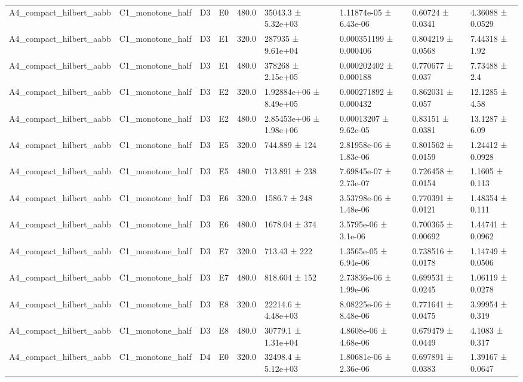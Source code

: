 \begin{table}
\begin{tabular}{lllllllll}
A4\_compact\_hilbert\_aabb & C1\_monotone\_half & D3 & E0 & 480.0 & 35043.3 ± 5.32e+03 & 1.11874e-05 ± 6.43e-06 & 0.60724 ± 0.0341 & 4.36088 ± 0.0529 \\
A4\_compact\_hilbert\_aabb & C1\_monotone\_half & D3 & E1 & 320.0 & 287935 ± 9.61e+04 & 0.000351199 ± 0.000406 & 0.804219 ± 0.0568 & 7.44318 ± 1.92 \\
A4\_compact\_hilbert\_aabb & C1\_monotone\_half & D3 & E1 & 480.0 & 378268 ± 2.15e+05 & 0.000202402 ± 0.000188 & 0.770677 ± 0.037 & 7.73488 ± 2.4 \\
A4\_compact\_hilbert\_aabb & C1\_monotone\_half & D3 & E2 & 320.0 & 1.92884e+06 ± 8.49e+05 & 0.000271892 ± 0.000432 & 0.862031 ± 0.057 & 12.1285 ± 4.58 \\
A4\_compact\_hilbert\_aabb & C1\_monotone\_half & D3 & E2 & 480.0 & 2.85453e+06 ± 1.98e+06 & 0.00013207 ± 9.62e-05 & 0.83151 ± 0.0381 & 13.1287 ± 6.09 \\
A4\_compact\_hilbert\_aabb & C1\_monotone\_half & D3 & E5 & 320.0 & 744.889 ± 124 & 2.81958e-06 ± 1.83e-06 & 0.801562 ± 0.0159 & 1.24412 ± 0.0928 \\
A4\_compact\_hilbert\_aabb & C1\_monotone\_half & D3 & E5 & 480.0 & 713.891 ± 238 & 7.69845e-07 ± 2.73e-07 & 0.726458 ± 0.0154 & 1.1605 ± 0.113 \\
A4\_compact\_hilbert\_aabb & C1\_monotone\_half & D3 & E6 & 320.0 & 1586.7 ± 248 & 3.53798e-06 ± 1.48e-06 & 0.770391 ± 0.0121 & 1.48354 ± 0.111 \\
A4\_compact\_hilbert\_aabb & C1\_monotone\_half & D3 & E6 & 480.0 & 1678.04 ± 374 & 3.5795e-06 ± 3.1e-06 & 0.700365 ± 0.00692 & 1.44741 ± 0.0962 \\
A4\_compact\_hilbert\_aabb & C1\_monotone\_half & D3 & E7 & 320.0 & 713.43 ± 222 & 1.3565e-05 ± 6.94e-06 & 0.738516 ± 0.0178 & 1.14749 ± 0.0506 \\
A4\_compact\_hilbert\_aabb & C1\_monotone\_half & D3 & E7 & 480.0 & 818.604 ± 152 & 2.73836e-06 ± 1.99e-06 & 0.699531 ± 0.0245 & 1.06119 ± 0.0278 \\
A4\_compact\_hilbert\_aabb & C1\_monotone\_half & D3 & E8 & 320.0 & 22214.6 ± 4.48e+03 & 8.08225e-06 ± 8.48e-06 & 0.771641 ± 0.0475 & 3.99954 ± 0.319 \\
A4\_compact\_hilbert\_aabb & C1\_monotone\_half & D3 & E8 & 480.0 & 30779.1 ± 1.31e+04 & 4.8608e-06 ± 4.68e-06 & 0.679479 ± 0.0449 & 4.1083 ± 0.317 \\
A4\_compact\_hilbert\_aabb & C1\_monotone\_half & D4 & E0 & 320.0 & 32498.4 ± 5.12e+03 & 1.80681e-06 ± 2.36e-06 & 0.697891 ± 0.0383 & 1.39167 ± 0.0647 \\

\end{tabular}
\end{table}
